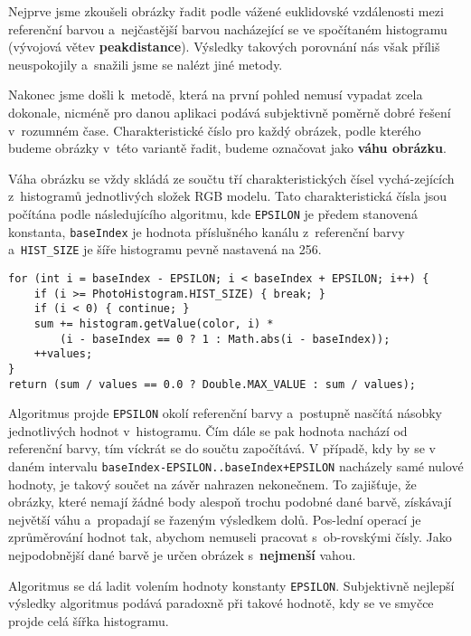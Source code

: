 \documentclass[12pt,oneside,a4paper]{article}
\newenvironment{listing}
{\begin{list}{}{\setlength{\leftmargin}{1em}}\item\scriptsize\bfseries}
{\end{list}}
\begin{document}
Nejprve jsme zkoušeli obrázky řadit podle vážené euklidovské vzdálenosti mezi referenční barvou a~nejčastější barvou nacházející se ve spočítaném histogramu (vývojová větev \textbf{peakdistance}). Výsledky takových porovnání nás však příliš neuspokojily a~snažili jsme se nalézt jiné metody.

Nakonec jsme došli k~metodě, která na první pohled nemusí vypadat zcela dokonale, nicméně pro danou aplikaci podává subjektivně poměrně dobré řešení v~rozumném čase. Charakteristické číslo pro každý obrázek, podle kterého budeme obrázky v~této variantě řadit, budeme označovat jako \textbf{váhu obrázku}.

Váha obrázku se vždy skládá ze součtu tří charakteristických čísel vychá-zejících z~histogramů jednotlivých složek RGB modelu. Tato charakteristická čísla jsou počítána podle následujícího algoritmu, kde \texttt{EPSILON} je předem stanovená konstanta, \texttt{baseIndex} je hodnota příslušného kanálu z~referenční barvy a~\texttt{HIST\_SIZE} je šíře histogramu pevně nastavená na 256.

\begin{listing}
\begin{verbatim}
for (int i = baseIndex - EPSILON; i < baseIndex + EPSILON; i++) {
    if (i >= PhotoHistogram.HIST_SIZE) { break; }
    if (i < 0) { continue; }
    sum += histogram.getValue(color, i) *
        (i - baseIndex == 0 ? 1 : Math.abs(i - baseIndex));
    ++values;
}
return (sum / values == 0.0 ? Double.MAX_VALUE : sum / values);
\end{verbatim}
\end{listing}

Algoritmus projde \texttt{EPSILON} okolí referenční barvy a~postupně nasčítá násobky jednotlivých hodnot v~histogramu. Čím dále se pak hodnota nachází od referenční barvy, tím víckrát se do součtu započítává. V případě, kdy by se v daném intervalu \texttt{baseIndex-EPSILON..baseIndex+EPSILON} nacházely samé nulové hodnoty, je takový součet na závěr nahrazen nekonečnem. To zajišťuje, že obrázky, které nemají žádné body alespoň trochu podobné dané barvě, získávají největší váhu a~propadají se řazeným výsledkem dolů. Pos-lední operací je zprůměrování hodnot tak, abychom nemuseli pracovat s~ob-rovskými čísly. Jako nejpodobnější dané barvě je určen obrázek s~\textbf{nejmenší} vahou.

Algoritmus se dá ladit volením hodnoty konstanty \texttt{EPSILON}. Subjektivně nejlepší výsledky algoritmus podává paradoxně při takové hodnotě, kdy se ve smyčce projde celá šířka histogramu.
\end{document}
